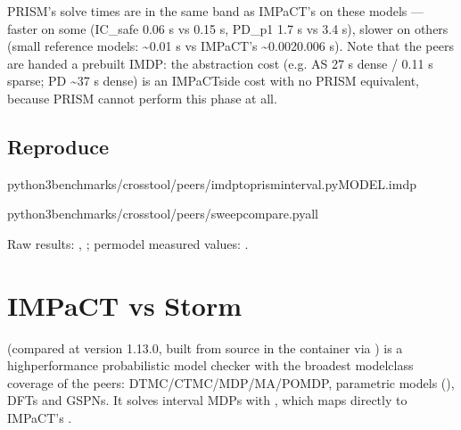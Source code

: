 \documentclass[a4paper,10pt,english]{sphinxmanual}
\begin{document}
\sphinxAtStartPar
PRISM’s solve times are in the same band as IMPaCT’s on these models — faster on some
(IC\_safe 0.06 s vs 0.15 s, PD\_p1 1.7 s vs 3.4 s), slower on others (small reference
models: \textasciitilde{}0.01 s vs IMPaCT’s \textasciitilde{}0.002\textendash{}0.006 s). Note that the peers are handed a pre\sphinxhyphen{}built
IMDP: the abstraction cost (e.g. AS 27 s dense / 0.11 s sparse; PD \textasciitilde{}37 s dense) is an
IMPaCT\sphinxhyphen{}side cost with no PRISM equivalent, because PRISM cannot perform this phase at
all.


\subsection{Reproduce}
\label{\detokenize{comparison/impact-vs-prism:reproduce}}
\begin{sphinxVerbatim}[commandchars=\\\{\}]
python3benchmarks/crosstool/peers/imdp\PYGZus{}to\PYGZus{}prism\PYGZus{}interval.pyMODEL.imdp

python3benchmarks/crosstool/peers/sweep\PYGZus{}compare.pyall
\end{sphinxVerbatim}

\sphinxAtStartPar
Raw results: , ; per\sphinxhyphen{}model measured
values: .

\sphinxstepscope


\section{IMPaCT vs Storm}
\label{\detokenize{comparison/impact-vs-storm:impact-vs-storm}}\label{\detokenize{comparison/impact-vs-storm::doc}}
\sphinxAtStartPar
{} (compared at version 1.13.0, built from source in
the  container via ) is a high\sphinxhyphen{}performance
probabilistic model checker with the broadest model\sphinxhyphen{}class coverage of the peers:
DTMC/CTMC/MDP/MA/POMDP, parametric models (), DFTs and GSPNs. It solves
interval MDPs with , which maps directly to
IMPaCT’s .
\end{document}
